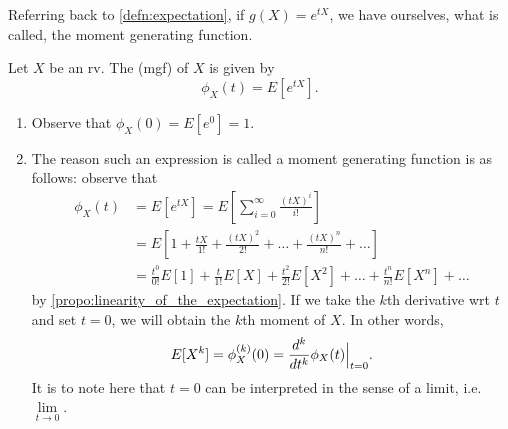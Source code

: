 \documentclass[notoc,notitlepage]{tufte-book}
\begin{document}
Referring back to \cref{defn:expectation}, if $g(X) = e^{tX}$, we have
ourselves, what is called, the moment generating function.

\begin{defn}
\label{defn:moment_generating_function}
  Let $X$ be an rv. The  (mgf) of $X$ is given by
  \begin{equation*}
    \phi_X(t) = E\left[ e^{tX} \right].
  \end{equation*}
\end{defn}

\begin{note}
  \begin{enumerate}
    \item Observe that $\phi_X(0) = E\left[ e^0 \right] = 1$.
    \item The reason such an expression is called a moment generating function
      is as follows: observe that
      \begin{align*}
        \phi_X(t) &= E\left[ e^{tX} \right] = E\left[ \sum_{i=0}^{\infty}
                    \frac{(tX)^i}{i!} \right] \\
                  &= E\left[ 1 + \frac{tX}{1!} + \frac{(tX)^2}{2!} + \hdots +
                    \frac{(tX)^n}{n!} + \hdots \right] \\
                  &= \frac{t^0}{0!} E[1] + \frac{t}{1!} E[X] + \frac{t^2}{2!}
                    E\left[X^2\right] + \hdots + \frac{t^n}{n!} E\left[X^n\right]
                    + \hdots
      \end{align*}
      by \cref{propo:linearity_of_the_expectation}. If we take the $k$th
      derivative wrt $t$ and set $t = 0$, we will obtain the $k$th moment of
      $X$. In other words,
      \begin{equation*}
        E[X^k] = \phi_X^{(k)}(0) = \frac{d^k}{dt^k} \phi_X (t) \Big|_{t = 0}^{}.
      \end{equation*}
      It is  to note here that $t = 0$ can be interpreted in
      the sense of a limit, i.e. $\lim\limits_{t \to 0}$.
  \end{enumerate}
\end{note}
\end{document}
